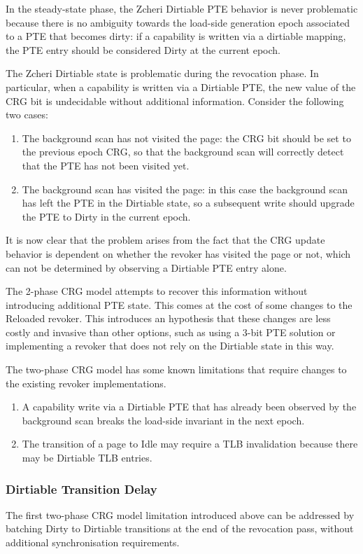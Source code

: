 In the steady-state phase, the Zcheri Dirtiable PTE behavior is never
problematic because there is no ambiguity towards the load-side generation epoch
associated to a PTE that becomes dirty: if a capability is written via a
dirtiable mapping, the PTE entry should be considered Dirty at the current epoch.

The Zcheri Dirtiable state is problematic during the revocation phase.
In particular, when a capability is written via a Dirtiable PTE, the new value
of the CRG bit is undecidable without additional information.
Consider the following two cases:
\begin{enumerate}
\item The background scan has not visited the page: the CRG bit should be set
  to the previous epoch CRG, so that the background scan will correctly detect
  that the PTE has not been visited yet.
\item The background scan has visited the page: in this case the background scan
  has left the PTE in the Dirtiable state, so a subsequent write should upgrade
  the PTE to Dirty in the current epoch.
\end{enumerate}
It is now clear that the problem arises from the fact that the CRG update
behavior is dependent on whether the revoker has visited the page or not,
which can not be determined by observing a Dirtiable PTE entry alone.

The 2-phase CRG model attempts to recover this information without introducing
additional PTE state. This comes at the cost of some changes to the Reloaded
revoker.
This introduces an hypothesis that these changes are less costly and invasive
than other options, such as using a 3-bit PTE solution or implementing a
revoker that does not rely on the Dirtiable state in this way.

The two-phase CRG model has some known limitations that require changes to the
existing revoker implementations.

\begin{enumerate}
\item A capability write via a Dirtiable PTE that has already been observed by
  the background scan breaks the load-side invariant in the next epoch.
\item The transition of a page to Idle may require a TLB invalidation because
  there may be Dirtiable TLB entries.
\end{enumerate}

\subsubsection{Dirtiable Transition Delay}
The first two-phase CRG model limitation introduced above can be addressed
by batching Dirty to Dirtiable transitions at the end of the revocation pass,
without additional synchronisation requirements.

